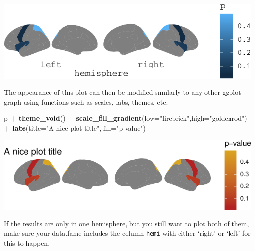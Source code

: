 \documentclass[fleqn,10pt]{wlpeerj} %
\newenvironment{Shaded}{\begin{snugshade}}{\end{snugshade}}
\newcommand{\DataTypeTok}[1]{\textcolor[rgb]{0.13,0.29,0.53}{#1}}
\newcommand{\KeywordTok}[1]{\textcolor[rgb]{0.13,0.29,0.53}{\textbf{#1}}}
\newcommand{\NormalTok}[1]{#1}
\newcommand{\OperatorTok}[1]{\textcolor[rgb]{0.81,0.36,0.00}{\textbf{#1}}}
\newcommand{\StringTok}[1]{\textcolor[rgb]{0.31,0.60,0.02}{#1}}
\begin{document}
\includegraphics{draft_2_files/figure-latex/datasupp-1.pdf}

The appearance of this plot can then be modified similarly to any other ggplot graph using functions such as scales, labs, themes, etc.

\begin{Shaded}
\begin{Highlighting}[]
\NormalTok{p }\OperatorTok{+}
\StringTok{  }\KeywordTok{theme_void}\NormalTok{() }\OperatorTok{+}
\StringTok{  }\KeywordTok{scale_fill_gradient}\NormalTok{(}\DataTypeTok{low=}\StringTok{"firebrick"}\NormalTok{,}\DataTypeTok{high=}\StringTok{"goldenrod"}\NormalTok{) }\OperatorTok{+}
\StringTok{  }\KeywordTok{labs}\NormalTok{(}\DataTypeTok{title=}\StringTok{"A nice plot title"}\NormalTok{, }\DataTypeTok{fill=}\StringTok{"p-value"}\NormalTok{)}
\end{Highlighting}
\end{Shaded}

\includegraphics{draft_2_files/figure-latex/datasupp2-1.pdf}

If the results are only in one hemisphere, but you still want to plot both of them, make sure your data.fame includes the column \texttt{hemi} with either `right' or `left' for this to happen.

\begin{Shaded}
\end{Shaded}
\end{document}
